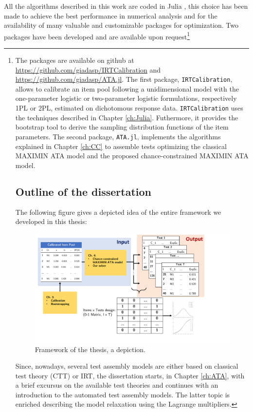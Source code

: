 All the algorithms described in this work are coded in Julia \parencite{bezanson2017julia}, this choice has been made to achieve the best performance in numerical analysis and for the availability of many valuable and customizable packages for optimization. Two packages have been developed and are available upon request\footnote{The packages are available on github at \url{https://github.com/giadasp/IRTCalibration} and \url{https://github.com/giadasp/ATA.jl}. The first package, \texttt{IRTCalibration}, allows to calibrate an item pool following a unidimensional model with the one-parameter logistic or two-parameter logistic formulations, respectively 1PL or 2PL, estimated on dichotomous response data. \texttt{IRTCalibration} uses the techniques described in Chapter \ref{ch:Julia}. Futhermore, it provides the bootstrap tool to derive the sampling distribution functions of the item parameters. The second package, \texttt{ATA.jl}, implements the algorithms explained in Chapter \ref{ch:CC} to assemble tests optimizing the classical MAXIMIN ATA model and the proposed chance-constrained MAXIMIN ATA model.

\section{Outline of the dissertation}
The following figure gives a depicted idea of the entire framework we developed in this thesis:

\begin{figure}[H]
	\centering
	\includegraphics[width=\linewidth]{Figures/STEP3.pdf}
	\caption{Framework of the thesis, a depiction.} 
\end{figure}

Since, nowadays, several test assembly models are either based on classical test theory (CTT) or IRT, the dissertation starts, in Chapter \ref{ch:ATA}, with a brief excursus on the available test theories and continues with an introduction to the automated test assembly models. The latter topic is enriched describing the model relaxation using the Lagrange multipliers. 

}
